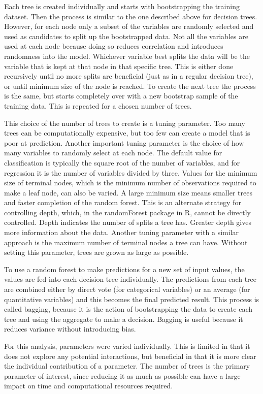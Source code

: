 \documentclass[
]{article}
\begin{document}
Each tree is created individually and starts with bootstrapping the
training dataset. Then the process is similar to the one described above
for decision trees. However, for each node only a subset of the
variables are randomly selected and used as candidates to split up the
bootstrapped data. Not all the variables are used at each node because
doing so reduces correlation and introduces randomness into the model.
Whichever variable best splits the data will be the variable that is
kept at that node in that specific tree. This is either done recursively
until no more splits are beneficial (just as in a regular decision
tree), or until minimum size of the node is reached. To create the next
tree the process is the same, but starts completely over with a new
bootstrap sample of the training data. This is repeated for a chosen
number of trees.

This choice of the number of trees to create is a tuning parameter. Too
many trees can be computationally expensive, but too few can create a
model that is poor at prediction. Another important tuning parameter is
the choice of how many variables to randomly select at each node. The
default value for classification is typically the square root of the
number of variables, and for regression it is the number of variables
divided by three. Values for the minimum size of terminal nodes, which
is the minimum number of observations required to make a leaf node, can
also be varied. A large minimum size means smaller trees and faster
completion of the random forest. This is an alternate strategy for
controlling depth, which, in the randomForest package in R, cannot be
directly controlled. Depth indicates the number of splits a tree has.
Greater depth gives more information about the data. Another tuning
parameter with a similar approach is the maximum number of terminal
nodes a tree can have. Without setting this parameter, trees are grown
as large as possible.

To use a random forest to make predictions for a new set of input
values, the values are fed into each decision tree individually. The
predictions from each tree are combined either by direct vote (for
categorical variables) or an average (for quantitative variables) and
this becomes the final predicted result. This process is called bagging,
because it is the action of bootstrapping the data to create each tree
and using the aggregate to make a decision. Bagging is useful because it
reduces variance without introducing bias.

For this analysis, parameters were varied individually. This is limited
in that it does not explore any potential interactions, but beneficial
in that it is more clear the individual contribution of a parameter. The
number of trees is the primary parameter of interest, since reducing it
as much as possible can have a large impact on time and computational
resources required.
\end{document}
